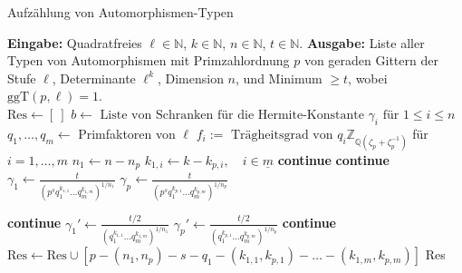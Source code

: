 \documentclass[12pt,a4paper,halfparskip,headsepline,bibtotocnumbered]{scrreprt}
\theoremstyle{nummermitklammern}
\theoremstyle{nonumberbreak}
\newcommand{\N}{\mathbb{N}}
\newcommand{\Z}{\mathbb{Z}}
\newcommand{\Q}{\mathbb{Q}}
\newcommand{\ggT}{\text{ggT}}
\begin{document}
\begin{algorithm}[H]
	\caption{Aufzählung von Automorphismen-Typen}\label{alg:autotypes}
	\begin{algorithmic}[1]
		\State \textbf{Eingabe:} Quadratfreies $\ell \in \N$, $k \in \N$, $n \in \N$, $t \in \N$.
		\State \textbf{Ausgabe:} Liste aller Typen von Automorphismen mit Primzahlordnung $p$ von geraden Gittern der Stufe $\ell$, Determinante $\ell^k$, Dimension $n$, und Minimum $\geq t$, wobei $\ggT(p, \ell) = 1$.
		\\
		\State $\text{Res} \gets \left[ \ \right]$
		\State $b \gets \text{ Liste von Schranken für die Hermite-Konstante } \gamma_i \text{ für } 1 \leq i \leq n$
		\State $q_1, \dots, q_m \gets$ Primfaktoren von $\ell$
			\State $f_i := \text{ Trägheitsgrad von } q_i \Z_{\Q(\zeta_p + \zeta_p^{-1})}$ für $i=1, \dots, m$
				\State $n_1 \gets n - n_p$
					\State $k_{1,i} \gets k - k_{p,i}, \quad i \in \underline{m}$
						\State \textbf{continue}
					\EndIf
						 \textbf{continue} \EndIf
						\State $\gamma_1 \gets \frac{t}{\left(p^s q_1^{k_{1,1}} \dots q_m^{k_{1,m}}\right)^{1/n_1}}$
						\State $\gamma_p \gets \frac{t}{\left(p^s q_1^{k_{p,1}} \dots q_m^{k_{p,m}}\right)^{1/n_p}}$
						
						 \textbf{continue} \EndIf
							\State $\gamma_1' \gets \frac{t/2}{\left(q_1^{k_{1,1}} \dots q_m^{k_{1,m}}\right)^{1/n_1}}$
							\State $\gamma_p' \gets \frac{t/2}{\left(q_1^{k_{p,1}} \dots q_m^{k_{p,m}}\right)^{1/n_p}}$
							 \textbf{continue} \EndIf
						\EndIf
						\State $\text{Res} \gets \text{Res} \cup \left[ p - (n_1, n_p) - s - q_1 - (k_{1,1}, k_{p,1}) - \dots - (k_{1,m}, k_{p,m}) \right]$
					\EndFor
				\EndFor 
			\EndFor
		\EndFor
		\State \Return Res
	\end{algorithmic}
\end{algorithm}
\end{document}
